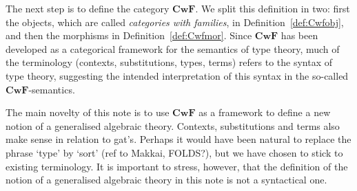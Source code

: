 \documentclass{lmcs}
\def\Cwf{\mathbf{CwF}}
\begin{document}
The next step is to define the category $\Cwf$. 
We split this definition in two: first the objects, 
which are called \emph{categories with families}, in Definition~\ref{def:Cwfobj},
and then the morphisms in Definition~\ref{def:Cwfmor}. 
Since $\Cwf$ has been developed as a categorical framework for the semantics of
type theory, much of the terminology (contexts, substitutions,
types, terms) refers to the syntax of type theory, 
suggesting the intended interpretation of this syntax in the 
so-called $\Cwf$-semantics.

The main novelty of this note is to use $\Cwf$ as a framework
to define a new notion of a generalised algebraic theory. 
Contexts, substitutions and terms also make
sense in relation to gat's. Perhaps it would have been natural
to replace the phrase `type' by `sort' (ref to Makkai, FOLDS?),
but we have chosen to stick to existing terminology.
It is important to stress, however, that the definition
of the notion of a generalised algebraic theory in this note
is not a syntactical one. 
\end{document}
